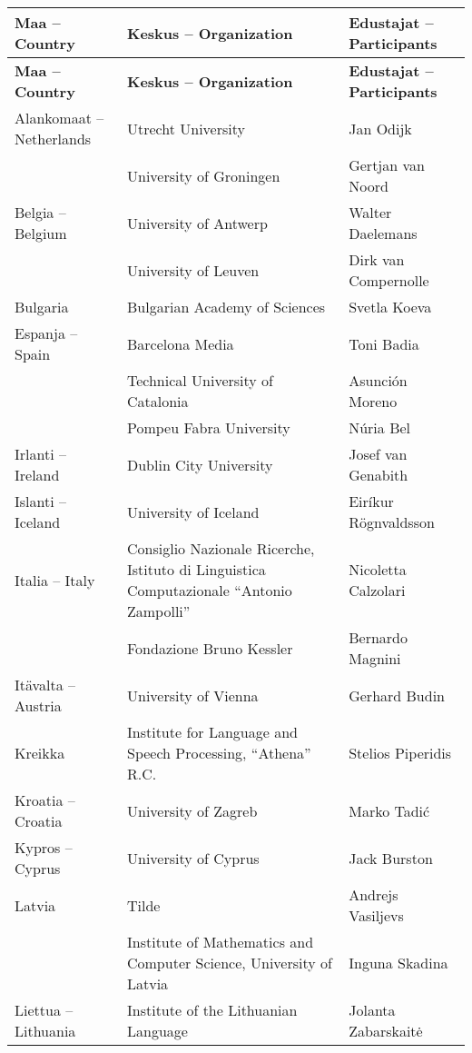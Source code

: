 \documentclass[]{../../metanetpaper}
\begin{document}
\begin{longtable}{p{3.5cm}|p{5.5cm}|p{5cm}}
 \hline \textbf{Maa -- Country}
 & \textbf{Keskus -- Organization}
 & \textbf{Edustajat -- Participants}
 \\ \hline \endfirsthead
 \hline \textbf{Maa -- Country}
 & \raggedright \textbf{Keskus -- Organization}
 & \textbf{Edustajat -- Participants}
 \\ \hline \endhead
 Alankomaat -- Netherlands
 &  Utrecht University
 &  Jan Odijk
 \\
 &  University of Groningen
 &  Gertjan van Noord
 \\ \hline
 Belgia -- Belgium
 &  University of Antwerp
 &  Walter Daelemans
 \\
 &  University of Leuven
 &  Dirk van Compernolle
 \\ \hline
 Bulgaria
 &  Bulgarian Academy of Sciences
 &  Svetla Koeva
 \\ \hline
 Espanja -- Spain
 &  Barcelona Media
 &  Toni Badia
 \\
 &  Technical University of Catalonia
 &  Asunción Moreno
 \\
 &  Pompeu Fabra University
 &  Núria Bel
 \\ \hline
 Irlanti -- Ireland
 &  Dublin City University
 & Josef van Genabith
 \\ \hline
 Islanti -- Iceland
 &  University of Iceland
 &  Eiríkur Rögnvaldsson
 \\ \hline
 Italia -- Italy
 &  Consiglio Nazionale Ricerche,
    Istituto di Linguistica
    Computazionale “Antonio
    Zampolli”
 &  Nicoletta Calzolari
 \\
 &  Fondazione Bruno Kessler
 &  Bernardo Magnini
 \\ \hline
 Itävalta -- Austria
 &  University of Vienna
 &  Gerhard Budin
 \\ \hline
 Kreikka
 &  Institute for Language and        
    Speech Processing, “Athena” R.C.
 & Stelios Piperidis
 \\ \hline
 Kroatia -- Croatia
 &  University of Zagreb
 &  Marko Tadić
 \\ \hline
 Kypros -- Cyprus
 &  University of Cyprus
 &  Jack Burston
 \\ \hline
 Latvia
 &  Tilde
 &  Andrejs Vasiljevs
 \\
 &  Institute of Mathematics and      
    Computer Science, University of  
    Latvia
 &  Inguna Skadina
 \\ \hline
 Liettua -- Lithuania
 &  Institute of the Lithuanian       
    Language
 &  Jolanta Zabarskaitė

\end{longtable}
\end{document}
